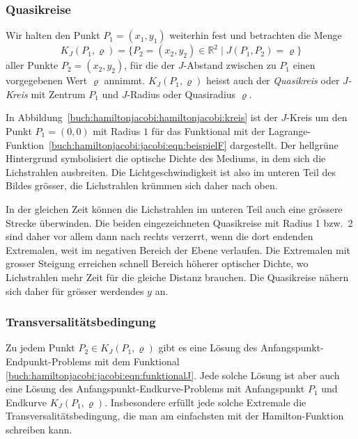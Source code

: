 %
%
\subsubsection{Quasikreise}
Wir halten den Punkt $P_1=(x_1,y_1)$ weiterhin fest und betrachten die
Menge
\[
K_J(P_1,\varrho)
=
\{
P_2=(x_2,y_2)\in\mathbb{R}^2
\mid
J(P_1,P_2) = \varrho
\}
\]
aller Punkte $P_2=(x_2,y_2)$, für die der $J$-Abstand zwischen
zu $P_1$ einen vorgegebenen Wert $\varrho$ annimmt.
$K_J(P_1,\varrho)$ heisst auch der {\em Quasikreis} oder {\em $J$-Kreis}
mit Zentrum $P_1$ und $J$-Radius oder Quasiradius $\varrho$.

\begin{beispiel}
In Abbildung~\ref{buch:hamiltonjacobi:hamiltonjacobi:kreis} ist der
$J$-Kreis um den Punkt $P_1=(0,0)$ mit Radius $1$ für das Funktional
mit der Lagrange-Funktion~\eqref{buch:hamiltonjacobi:jacobi:eqn:beispielF}
dargestellt.
Der hellgrüne Hintergrund symbolisiert die optische Dichte des Mediums,
in dem sich die Lichstrahlen ausbreiten.
Die Lichtgeschwindigkeit ist also im unteren Teil des Bildes grösser,
die Lichstrahlen krümmen sich daher nach oben.

In der gleichen Zeit können die Lichstrahlen im unteren Teil auch
eine grössere Strecke überwinden.
Die beiden eingezeichneten Quasikreise mit Radius 1 bzw.~2 sind 
daher vor allem dann nach rechts verzerrt, wenn die dort
endenden Extremalen, weit im negativen Bereich der Ebene verlaufen.
Die Extremalen mit grosser Steigung erreichen schnell Bereich höherer
optischer Dichte, wo Lichstrahlen mehr Zeit für die gleiche Distanz
brauchen.
Die Quasikreise nähern sich daher für grösser werdendes $y$ an.
\end{beispiel}

%
%
\subsubsection{Transversalitätsbedingung}
Zu jedem Punkt $P_2\in K_J(P_1,\varrho)$ gibt es eine Lösung des
Anfangspunkt-Endpunkt-Problems mit dem Funktional
\eqref{buch:hamiltonjacobi:jacobi:eqn:funktionalJ}.
Jede solche Lösung ist aber auch eine Lösung des
Anfangspunkt-Endkurve-Problems mit Anfangspunkt $P_1$ und
Endkurve $K_J(P_1,\varrho)$.
Insbesondere erfüllt jede solche Extremale die Transversalitätsbedingung,
die man am einfachsten mit der Hamilton-Funktion schreiben kann.

